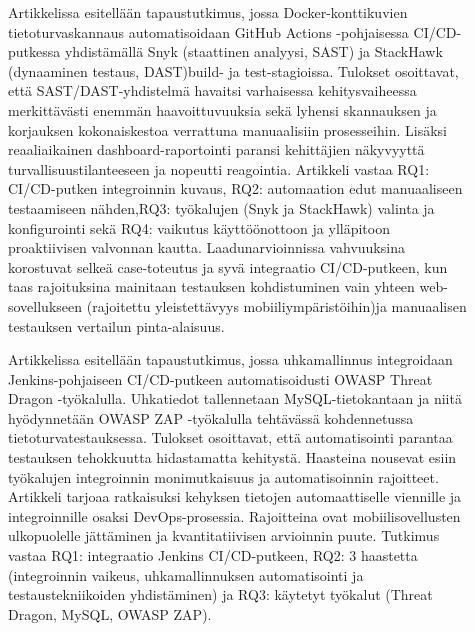 \documentclass[bscthesis,finnish,oneside,biblatex]{uefcsthesis}
\begin{document}
    \begin{description}
        \item[\cite{marandi2023_ias}] Artikkelissa esitellään tapaustutkimus, jossa Docker-konttikuvien tietoturvaskannaus automatisoidaan GitHub Actions -pohjaisessa CI/CD-putkessa yhdistämällä Snyk (staattinen analyysi, SAST) ja StackHawk (dynaaminen testaus, DAST)build- ja test-stagioissa. Tulokset osoittavat, että SAST/DAST-yhdistelmä havaitsi varhaisessa kehitysvaiheessa merkittävästi enemmän haavoittuvuuksia sekä lyhensi skannauksen ja korjauksen kokonaiskestoa verrattuna manuaalisiin prosesseihin. Lisäksi reaaliaikainen dashboard-raportointi paransi kehittäjien näkyvyyttä turvallisuustilanteeseen ja nopeutti reagointia. Artikkeli vastaa RQ1: CI/CD-putken integroinnin kuvaus, RQ2: automaation edut manuaaliseen testaamiseen nähden,RQ3: työkalujen (Snyk ja StackHawk) valinta ja konfigurointi sekä RQ4: vaikutus käyttöönottoon ja ylläpitoon proaktiivisen valvonnan kautta. Laadunarvioinnissa vahvuuksina korostuvat selkeä case-toteutus ja syvä integraatio CI/CD-putkeen, kun taas rajoituksina mainitaan testauksen kohdistuminen vain yhteen web-sovellukseen (rajoitettu yleistettävyys mobiiliympäristöihin)ja manuaalisen testauksen vertailun pinta-alaisuus.
    \end{description}

    \begin{description}
        \item[\cite{nikolov2024_fit}] Artikkelissa esitellään tapaustutkimus, jossa uhkamallinnus integroidaan Jenkins-pohjaiseen CI/CD-putkeen automatisoidusti OWASP Threat Dragon -työkalulla. Uhkatiedot tallennetaan MySQL-tietokantaan ja niitä hyödynnetään OWASP ZAP -työkalulla tehtävässä kohdennetussa tietoturvatestauksessa. Tulokset osoittavat, että automatisointi parantaa testauksen tehokkuutta hidastamatta kehitystä. Haasteina nousevat esiin työkalujen integroinnin monimutkaisuus ja automatisoinnin rajoitteet. Artikkeli tarjoaa ratkaisuksi kehyksen tietojen automaattiselle viennille ja integroinnille osaksi DevOps-prosessia. Rajoitteina ovat mobiilisovellusten ulkopuolelle jättäminen ja kvantitatiivisen arvioinnin puute. Tutkimus vastaa RQ1: integraatio Jenkins CI/CD-putkeen, RQ2: 3 haastetta (integroinnin vaikeus, uhkamallinnuksen automatisointi ja testaustekniikoiden yhdistäminen) ja RQ3: käytetyt työkalut (Threat Dragon, MySQL, OWASP ZAP).
    \end{description}
\end{document}
